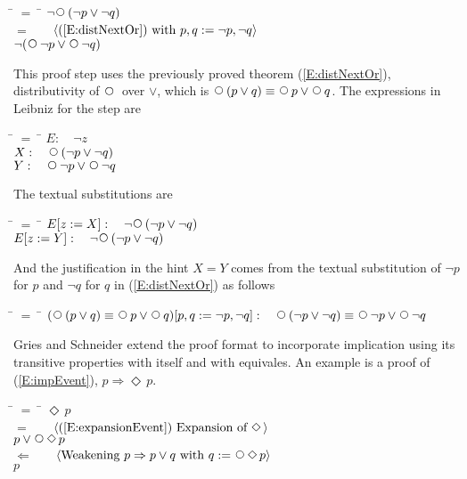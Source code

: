 \documentclass[fleqn, leqno]{article}
\newcommand{\lgap}{2pt} %
\newcommand{\mymathindent}{24pt} %
\newcommand{\impl}{\ensuremath{\Rightarrow}} %
\newcommand{\Next}{\;\,\text{\raisebox{3.5pt}{\circle{6}}}}
\newcommand{\Event}{\Diamond\,}
\newcommand{\Gll} {\langle} %
\newcommand{\Ggg} {\rangle} %
\newcommand{\Hint}[1] {\ \ \ $\Gll \mbox{#1} \Ggg$ } %
\begin{document}
\begin{tabbing}
\hspace{\mymathindent} \= $= \;$ \= \kill
\> \> $\lnot\Next (\lnot p \lor \lnot q)$\\[\lgap]
\> $=$ \> \Hint{(\ref{E:distNextOr}) with $p,q := \lnot p, \lnot q$}\\[\lgap]
\> \> $\lnot (\Next\lnot p \lor \Next \lnot q)$
\end{tabbing}

This proof step uses the previously proved theorem (\ref{E:distNextOr}), distributivity of $\Next$ over $\lor$,
which is $\Next (p \lor q) \equiv \Next p \lor \Next q$.
The expressions in Leibniz for the step are

\begin{tabbing}
\hspace{\mymathindent} \= $= \;$ \= \kill
\> $E:\quad \lnot z$\\[\lgap]
\> $X:\quad \Next (\lnot p \lor \lnot q)$\\[\lgap]
\> $Y:\quad \Next \lnot p \lor \Next \lnot q$
\end{tabbing}

The textual substitutions are

\begin{tabbing}
\hspace{\mymathindent} \= $= \;$ \= \kill
\> $E[z:=X]:\quad \lnot\Next (\lnot p \lor \lnot q)$\\[\lgap]
\> $E[z:=Y]:\quad \lnot\Next (\lnot p \lor \lnot q)$
\end{tabbing}

And the justification in the hint $X=Y$ comes from the textual substitution of $\lnot p$ for $p$
and $\lnot q$ for $q$ in (\ref{E:distNextOr}) as follows

\begin{tabbing}
\hspace{\mymathindent} \= $= \;$ \= \kill
\> $(\Next (p \lor q) \equiv \Next p \lor \Next q)[p,q:=\lnot p, \lnot q]:\quad
\Next (\lnot p \lor \lnot q) \equiv \Next \lnot p \lor \Next \lnot q$
\end{tabbing}

Gries and Schneider \cite{LADM} extend the proof format to incorporate implication using its transitive properties
with itself and with equivales.
An example is a proof of (\ref{E:impEvent}), $p \Rightarrow \Event p$.

\begin{tabbing}
\hspace{\mymathindent} \= $= \;$ \= \kill
\> \> $\Event p$\\[\lgap]
\> $=$ \> \Hint{(\ref{E:expansionEvent}) Expansion of $\Event$}\\[\lgap]
\> \> $p \lor \Next\Event p$\\[\lgap]
\> $\Leftarrow$ \> \Hint{Weakening $p\impl p\lor q$ with $q:=\Next\Event p$}\\[\lgap]
\> \> $p$
\end{tabbing}
\end{document}
